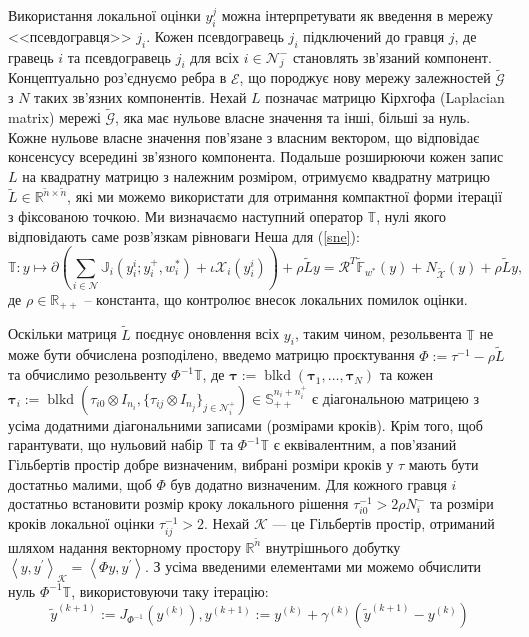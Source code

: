 \documentclass[a4paper]{article}
\begin{document}
Використання локальної оцінки $y_{i}^{j}$ можна інтерпретувати як введення в мережу <<псевдогравця>> $j_{i}$. Кожен псевдогравець $j_{i}$ підключений до гравця $j$, де гравець $i$ та псевдогравець $j_{i}$ для всіх $i \in \mathcal{N}_{j}^{ -}$ становлять зв'язаний компонент. Концептуально роз’єднуємо ребра в $\mathcal{E}$, що породжує нову мережу залежностей $\tilde{\mathcal{G}}$ з $N$ таких зв’язних компонентів. Нехай $L$ позначає матрицю Кірхгофа (Laplacian matrix) мережі $\tilde{\mathcal{G}}$, яка має нульове власне значення та інші, більші за нуль. Кожне нульове власне значення пов’язане з власним вектором, що відповідає консенсусу всередині зв’язного компонента. Подальше розширюючи кожен запис $L$ на квадратну матрицю з належним розміром, отримуємо квадратну матрицю $\tilde{L} \in \mathbb{R}^{\tilde{n} \times \tilde{n}} $, які ми можемо використати для отримання компактної форми ітерації з фіксованою точкою. Ми визначаємо наступний оператор $\mathbb{T}$, нулі якого відповідають саме розв'язкам рівноваги Неша для (\ref{sne}):
\begin{equation}
    \mathbb{T}: y \mapsto \partial\left(\sum_{i \in \mathcal{N}} \mathbb{J}_{i}(y_{i}^{i}; y_{i}^{+}, w_{i}^{*})+\iota \mathcal{\mathcal { X }}_{i}(y_{i}^{i})\right) +\rho \tilde{L} y=\mathcal{R}^{T} \tilde{\mathbb{F}}_{w^{*}}(y)+N_{\tilde{\mathcal{X} }}(y)+\rho \tilde{L} y,
\end{equation}
де $\rho \in \mathbb{R}_{++}$ – константа, що контролює внесок локальних помилок оцінки.

Оскільки матриця $\tilde{L}$ поєднує оновлення всіх $y_{i}$, таким чином, резольвента $\mathbb{T}$ не може бути обчислена розподілено, введемо матрицю проєктування $\Phi:=\tau^{-1}-\rho \tilde{L}$ та обчислимо резольвенту $\Phi^{-1} \mathbb{T}$, де $\boldsymbol{\tau}:=\operatorname{blkd }(\boldsymbol{\tau}_{1}, \ldots, \boldsymbol{\tau}_{N})$ та кожен $\boldsymbol{\tau}_{i}:=\operatorname{ blkd}(\tau_{i 0} \otimes I_{n_{i}},\{\tau_{i j} \otimes I_{n_{j}}\}_{j \in \mathcal {N}_{i}^{+}}) \in \mathbb{S}_{++}^{n_{i}+n_{i}^{+}}$ є діагональною матрицею з усіма додатними діагональними записами (розмірами кроків). Крім того, щоб гарантувати, що нульовий набір $\mathbb{T}$ та $\Phi^{-1} \mathbb{T}$ є еквівалентним, а пов'язаний Гільбертів простір добре визначеним, вибрані розміри кроків у $\tau$ мають бути достатньо малими, щоб $\Phi$ був додатно визначеним. Для кожного гравця $i$ достатньо встановити розмір кроку локального рішення $\tau_{i 0}^{-1}>2 \rho N_{i }^{-}$ та розміри кроків локальної оцінки $\tau_{i j}^{-1}>2$. Нехай $\mathcal{K}$ --- це Гільбертів простір, отриманий шляхом надання векторному простору $\mathbb{R}^{\tilde{n}}$ внутрішнього добутку $\left\langle y, y^{\prime} \right\rangle_{\mathcal{K}}=\left\langle\Phi y, y^{\prime}\right\rangle$. З усіма введеними елементами ми можемо обчислити нуль $\Phi^{-1} \mathbb{T}$, використовуючи таку ітерацію:
\begin{equation}\label{iterat}
    \tilde{y}^{(k+1)}:=J_{\Phi^{-1}}(y^{(k)}), y^{(k+1)}:= y^{(k)}+\gamma^{(k)}(\tilde{y}^{(k+1)}-y^{(k)})
\end{equation}
\end{document}

